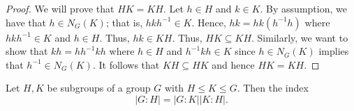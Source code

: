 \begin{proof}
We will prove that \( HK = KH  \). Let \( h \in H  \) and \( k \in K  \). By assumption, we have that \( h \in {N}_{G}(K) \); that is, \( h k h^{-1} \in K  \). Hence, \( h k = h k (h^{-1} h) \) where \( h k h^{-1} \in K  \) and \( h \in H  \). Thus, \( hk \in KH  \). Thus, \( HK \subseteq  KH  \). Similarly, we want to show that \( kh  = h h^{-1} kh  \) where \( h \in H  \) and \( h^{-1} k h  \in  K \) since \( h \in {N}_{G}(K) \) implies that \( h^{-1} \in {N}_{G}(K) \). It follows that \( KH \subseteq  HK  \) and hence \( HK = KH  \).
\end{proof}

\begin{theorem}[ ]
    Let \( H,K  \) be subgroups of a group \( G  \) with \( H \leq K \leq G  \). Then the index 
    \[  | G : H  |  = | G : K  | | K : H  |. \]
\end{theorem}
